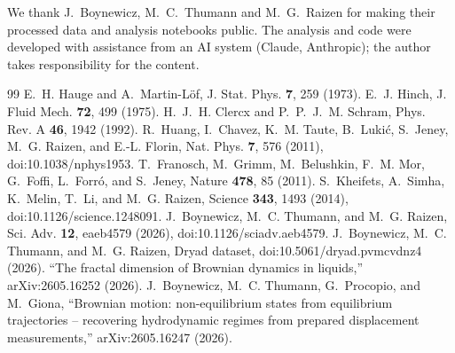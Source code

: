 \documentclass[aps,pre,10pt,twocolumn,superscriptaddress,amsmath,amssymb]{revtex4-2}
\begin{document}
\begin{acknowledgments}
We thank J.~Boynewicz, M.~C.~Thumann and M.~G.~Raizen for making their processed data and analysis notebooks public. The analysis and code were developed with assistance from an AI system (Claude, Anthropic); the author takes responsibility for the content.
\end{acknowledgments}

\begin{thebibliography}{99}
 E.~H. Hauge and A.~Martin-L\"of, J. Stat. Phys. \textbf{7}, 259 (1973).
 E.~J. Hinch, J. Fluid Mech. \textbf{72}, 499 (1975).
 H.~J.~H. Clercx and P.~P.~J.~M. Schram, Phys. Rev. A \textbf{46}, 1942 (1992).
 R.~Huang, I.~Chavez, K.~M. Taute, B.~Luki\'c, S.~Jeney, M.~G. Raizen, and E.-L. Florin, Nat. Phys. \textbf{7}, 576 (2011), doi:10.1038/nphys1953.
 T.~Franosch, M.~Grimm, M.~Belushkin, F.~M. Mor, G.~Foffi, L.~Forr\'o, and S.~Jeney, Nature \textbf{478}, 85 (2011).
 S.~Kheifets, A.~Simha, K.~Melin, T.~Li, and M.~G. Raizen, Science \textbf{343}, 1493 (2014), doi:10.1126/science.1248091.
 J.~Boynewicz, M.~C. Thumann, and M.~G. Raizen, Sci. Adv. \textbf{12}, eaeb4579 (2026), doi:10.1126/sciadv.aeb4579.
 J.~Boynewicz, M.~C. Thumann, and M.~G. Raizen, Dryad dataset, doi:10.5061/dryad.pvmcvdnz4 (2026).
 ``The fractal dimension of Brownian dynamics in liquids,'' arXiv:2605.16252 (2026).
 J.~Boynewicz, M.~C. Thumann, G.~Procopio, and M.~Giona, ``Brownian motion: non-equilibrium states from equilibrium trajectories -- recovering hydrodynamic regimes from prepared displacement measurements,'' arXiv:2605.16247 (2026).
\end{thebibliography}
\end{document}
